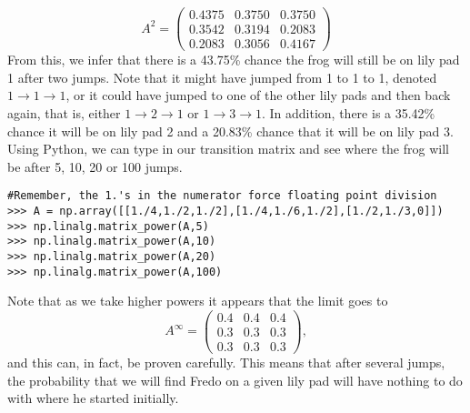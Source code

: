 \[
A^2 = \begin{pmatrix}
0.4375 & 0.3750 & 0.3750\\
0.3542 & 0.3194 & 0.2083\\
0.2083 & 0.3056 & 0.4167
\end{pmatrix}
\]
From this, we infer that there is a 43.75\% chance the frog will still be on lily pad 1 after two jumps.
Note that it might have jumped from 1 to 1 to 1, denoted $1 \rightarrow 1 \rightarrow 1$, or it could have jumped to one of the other lily pads and then back again, that is, either $1 \rightarrow 2 \rightarrow 1$ or $1 \rightarrow 3 \rightarrow 1$.
In addition, there is a 35.42\% chance it will be on lily pad 2 and a 20.83\% chance that it will be on lily pad 3.
Using Python, we can type in our transition matrix and see where the frog will be after 5, 10, 20 or 100 jumps.

\begin{lstlisting}
#Remember, the 1.'s in the numerator force floating point division
>>> A = np.array([[1./4,1./2,1./2],[1./4,1./6,1./2],[1./2,1./3,0]])
>>> np.linalg.matrix_power(A,5)
>>> np.linalg.matrix_power(A,10)
>>> np.linalg.matrix_power(A,20)
>>> np.linalg.matrix_power(A,100)
\end{lstlisting}

Note that as we take higher powers it appears that the limit goes to
\[
A^\infty = \begin{pmatrix}
0.4 & 0.4 & 0.4\\
0.3 & 0.3 & 0.3\\
0.3 & 0.3 & 0.3
\end{pmatrix},
\]
and this can, in fact, be proven carefully.
This means that after several jumps, the probability that we will find Fredo on a given lily pad will have nothing to do with where he started initially.


